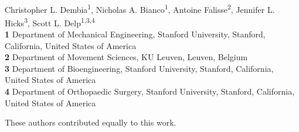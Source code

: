 \documentclass[10pt,letterpaper]{article}
\begin{document}
\vspace*{0.2in}

\begin{flushleft}
{\Large
    \textbf{}
}
    \newline
{\Large
    \textbf{}
}
\newline
\\
Christopher L. Dembia\textsuperscript{1\Yinyang},
Nicholas A. Bianco\textsuperscript{1\Yinyang},
Antoine Falisse\textsuperscript{2},
Jennifer L. Hicks\textsuperscript{3},
Scott L. Delp\textsuperscript{1,3,4}
\\
\bigskip
\textbf{1} Department of Mechanical Engineering, Stanford University, Stanford, California, United States of America
\\
\textbf{2} Department of Movement Sciences, KU Leuven, Leuven, Belgium
\\
\textbf{3} Department of Bioengineering, Stanford University, Stanford, California, United States of America
\\
\textbf{4} Department of Orthopaedic Surgery, Stanford University, Stanford, California, United States of America
\\
\bigskip

%
%
\Yinyang These authors contributed equally to this work.





\end{flushleft}
\end{document}
